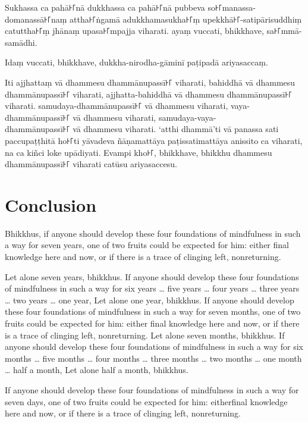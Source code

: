 Sukhassa ca pahā꜔꜒nā dukkhassa ca pahā꜔꜒nā pubbeva so꜔꜒manassa-domanassā꜔꜒naṃ attha꜔꜒ṅgamā
adukkhamasukha꜔꜒ṃ upekkhā꜔꜒-satipārisuddhiṃ catuttha꜔꜒ṃ jhānaṃ upasa꜔꜒mpajja viharati.
ayaṃ vuccati, bhikkhave, sa꜔꜒mmā-samādhi.

Idaṃ vuccati, bhikkhave, dukkha-nirodha-gāminī paṭipadā ariyasaccaṃ.

Iti ajjhattaṃ vā dhammesu dhammānupassī꜔꜒ viharati,
bahiddhā vā dhammesu dhammānupassī꜔꜒ viharati,
ajjhatta-bahiddhā vā dhammesu dhammānupassī꜔꜒ viharati.
samudaya-dhammānupassī꜔꜒ vā dhammesu viharati,
vaya-dhammānupassī꜔꜒ vā dhammesu viharati,
samudaya-vaya-\\ dhammānupassī꜔꜒ vā dhammesu viharati.
‘atthi dhammā’ti vā panassa sati paccupaṭṭhitā ho꜔꜒ti
yāvadeva ñāṇamattāya paṭissatimattāya anissito ca viharati,
na ca kiñci loke upādiyati. Evampi kho꜔꜒, bhikkhave, bhikkhu
dhammesu dhammānupassī꜔꜒ viharati catūsu ariyasaccesu.



\englishPage
\chapter{Conclusion}

Bhikkhus, if anyone should develop these four foundations of mindfulness in
such a way for seven years, one of two fruits could be expected for him: either
final knowledge here and now, or if there is a trace of clinging left,
nonreturning.

Let alone seven years, bhikkhus. If anyone should develop these four
foundations of mindfulness in such a way for six years \ldots{} five years
\ldots{} four years \ldots{} three years \ldots{} two years \ldots{} one year,
Let alone one year, bhikkhus. If anyone should develop these four foundations
of mindfulness in such a way for seven months, one of two fruits could be
expected for him: either final knowledge here and now, or if there is a trace of
clinging left, nonreturning. Let alone seven months, bhikkhus. If anyone should
develop these four foundations of mindfulness in such a way for six months
\ldots{} five months \ldots{} four months \ldots{} three months \ldots{} two
months \ldots{} one month \ldots{} half a month, Let alone half a month,
bhikkhus.

If anyone should develop these four foundations of mindfulness in such a way
for seven days, one of two fruits could be expected for him: eitherfinal
knowledge here and now, or if there is a trace of clinging left, nonreturning.

